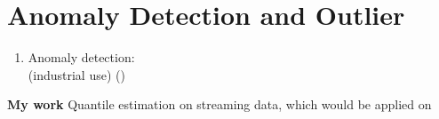 \documentclass[12pt]{article}
\begin{document}
\begin{enumerate}
\end{enumerate}


\section{Anomaly Detection and Outlier}

\begin{enumerate}
    \item Anomaly detection: \\
        \cite{emmottMetaAnalysisAnomalyDetection2015}
        (industrial use)
        ()
\end{enumerate}
\newpage
\textbf{My work} Quantile estimation on streaming data, which would be applied on 

\newpage


\end{document}
